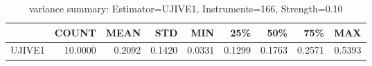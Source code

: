 \begin{table}[ht]
\centering
\caption{variance summary: Estimator=UJIVE1, Instruments=166, Strength=0.10}
\begin{tabular}{lrrrrrrrr}
\toprule
 & COUNT & MEAN & STD & MIN & 25\% & 50\% & 75\% & MAX \\
\midrule
UJIVE1 & 10.0000 & 0.2092 & 0.1420 & 0.0331 & 0.1299 & 0.1763 & 0.2571 & 0.5393 \\
\bottomrule
\end{tabular}
\end{table}
